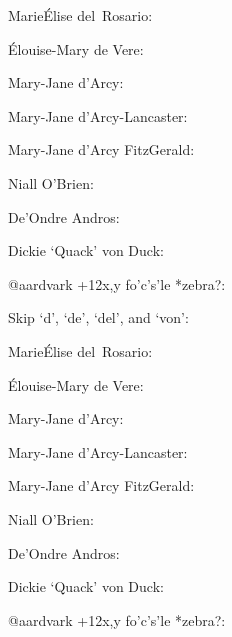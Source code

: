 \documentclass[12pt]{article}
\begin{document}
Marie\space Élise del~Rosario:

Élouise-Mary de Vere:  

Mary-Jane d'Arcy:  

Mary-Jane d'Arcy-Lancaster:  

Mary-Jane d'Arcy FitzGerald:  

Niall O'Brien:  

De'Ondre Andros:  

Dickie `Quack' von Duck:

@aardvark +12x,y fo'c's'le *zebra?:

Skip `d', `de', `del', and `von':
\renewcommand{\DTLStoreInitialGetLetter}[2]{%
 \DTLifinlist{#1}{d,de,del,von}{\def#2{}}
 {\DTLGetInitialLetter{#1}{#2}}%
 } 

Marie\space Élise del~Rosario:

Élouise-Mary de Vere:  

Mary-Jane d'Arcy:  

Mary-Jane d'Arcy-Lancaster:  

Mary-Jane d'Arcy FitzGerald:  

Niall O'Brien:  

De'Ondre Andros:  

Dickie `Quack' von Duck:

@aardvark +12x,y fo'c's'le *zebra?:
\end{document}
